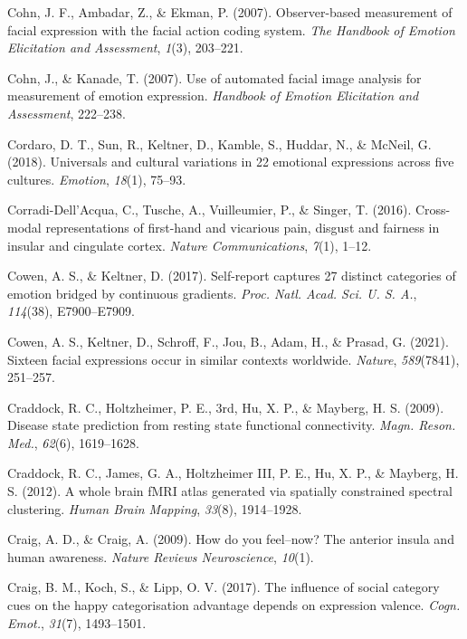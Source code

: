 \documentclass[12pt,american,a4paper,oneside,]{memoir} %
\begin{document}
\leavevmode\hypertarget{ref-Cohn2007-az}{}%
Cohn, J. F., Ambadar, Z., \& Ekman, P. (2007). Observer-based measurement of facial expression with the facial action coding system. \emph{The Handbook of Emotion Elicitation and Assessment}, \emph{1}(3), 203--221.

\leavevmode\hypertarget{ref-Cohn2007-xe}{}%
Cohn, J., \& Kanade, T. (2007). Use of automated facial image analysis for measurement of emotion expression. \emph{Handbook of Emotion Elicitation and Assessment}, 222--238.

\leavevmode\hypertarget{ref-Cordaro2018-xm}{}%
Cordaro, D. T., Sun, R., Keltner, D., Kamble, S., Huddar, N., \& McNeil, G. (2018). Universals and cultural variations in 22 emotional expressions across five cultures. \emph{Emotion}, \emph{18}(1), 75--93.

\leavevmode\hypertarget{ref-corradi2016cross}{}%
Corradi-Dell'Acqua, C., Tusche, A., Vuilleumier, P., \& Singer, T. (2016). Cross-modal representations of first-hand and vicarious pain, disgust and fairness in insular and cingulate cortex. \emph{Nature Communications}, \emph{7}(1), 1--12.

\leavevmode\hypertarget{ref-Cowen2017-vz}{}%
Cowen, A. S., \& Keltner, D. (2017). Self-report captures 27 distinct categories of emotion bridged by continuous gradients. \emph{Proc. Natl. Acad. Sci. U. S. A.}, \emph{114}(38), E7900--E7909.

\leavevmode\hypertarget{ref-Cowen2021-ld}{}%
Cowen, A. S., Keltner, D., Schroff, F., Jou, B., Adam, H., \& Prasad, G. (2021). Sixteen facial expressions occur in similar contexts worldwide. \emph{Nature}, \emph{589}(7841), 251--257.

\leavevmode\hypertarget{ref-Craddock2009-kz}{}%
Craddock, R. C., Holtzheimer, P. E., 3rd, Hu, X. P., \& Mayberg, H. S. (2009). Disease state prediction from resting state functional connectivity. \emph{Magn. Reson. Med.}, \emph{62}(6), 1619--1628.

\leavevmode\hypertarget{ref-craddock2012whole}{}%
Craddock, R. C., James, G. A., Holtzheimer III, P. E., Hu, X. P., \& Mayberg, H. S. (2012). A whole brain fMRI atlas generated via spatially constrained spectral clustering. \emph{Human Brain Mapping}, \emph{33}(8), 1914--1928.

\leavevmode\hypertarget{ref-craig2009you}{}%
Craig, A. D., \& Craig, A. (2009). How do you feel--now? The anterior insula and human awareness. \emph{Nature Reviews Neuroscience}, \emph{10}(1).

\leavevmode\hypertarget{ref-Craig2017-db}{}%
Craig, B. M., Koch, S., \& Lipp, O. V. (2017). The influence of social category cues on the happy categorisation advantage depends on expression valence. \emph{Cogn. Emot.}, \emph{31}(7), 1493--1501.
\end{document}
